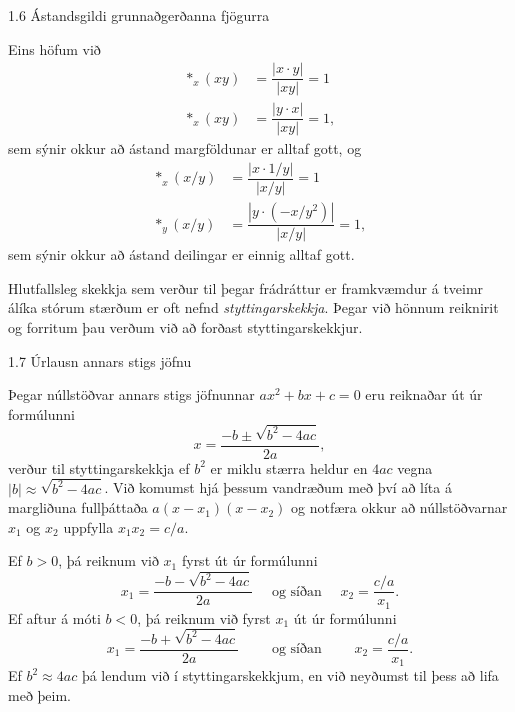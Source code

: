 %
\begin{frame}{1.6 Ástandsgildi grunnaðgerðanna fjögurra} 


 Eins höfum við 
\begin{align*}
    \ast_x(xy) &= \dfrac{|x\cdot y|}{|xy|} = 1 \\
    \ast_x(xy) &= \dfrac{|y\cdot x|}{|xy|} = 1,
\end{align*}
sem sýnir okkur að ástand margföldunar er alltaf gott, \pause
og
\begin{align*}
    \ast_x(x/y) &= \dfrac{|x\cdot 1/y|}{|x/y|} = 1 \\
    \ast_y(x/y) &= \dfrac{|y\cdot (-x/y^2)|}{|x/y|} = 1,
\end{align*}
sem sýnir okkur að ástand deilingar er einnig alltaf gott.

\pause 
\smallskip


Hlutfallsleg skekkja sem verður til þegar frádráttur er
framkvæmdur á tveimr álíka stórum stærðum er oft nefnd
{\it styttingarskekkja}. Þegar við hönnum reiknirit og  
forritum þau verðum við að forðast styttingarskekkjur.
\end{frame}

%
\begin{frame}{1.7 Úrlausn annars stigs jöfnu} 

Þegar núllstöðvar annars stigs jöfnunnar $ax^2+bx+c=0$  eru reiknaðar
út úr formúlunni  
\begin{equation*}
    x = \dfrac{-b\pm\sqrt{b^2-4ac}}{2a},
\end{equation*}
verður til styttingarskekkja ef $b^2$ er miklu stærra heldur en $4ac$
vegna $|b|\approx\sqrt{b^2-4ac}$. \pause Við komumst hjá þessum vandræðum með
því að líta á margliðuna fullþáttaða $a(x-x_1)(x-x_2)$ og notfæra
okkur að núllstöðvarnar  $x_1$ og $x_2$ uppfylla
$x_1x_2=c/a$. 

\pause
\smallskip
Ef $b>0$, þá reiknum við $x_1$ fyrst út úr formúlunni
\begin{equation*}
    x_1 = \dfrac{-b-\sqrt{b^2-4ac}}{2a}
    \quad \text{ og  síðan } \quad
    x_2 = \dfrac{c/a}{x_1}.
\end{equation*}\pause
Ef aftur á móti $b<0$, þá reiknum við fyrst $x_1$ út úr  formúlunni
\begin{equation*}
    x_1 = \dfrac{-b+\sqrt{b^2-4ac}}{2a} 
    \qquad \text{ og síðan } \qquad 
    x_2 = \dfrac{c/a}{x_1}.
\end{equation*}\pause
Ef $b^2\approx 4ac$ þá lendum við í styttingarskekkjum, en við
neyðumst til þess að lifa með þeim. 
\end{frame}
%


